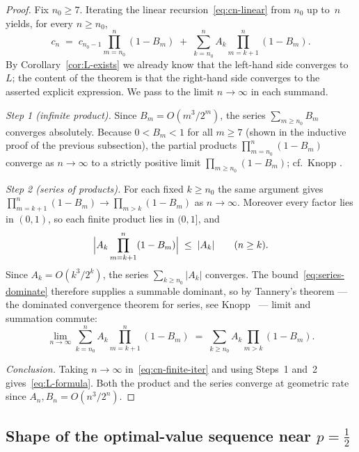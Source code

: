 \documentclass[12pt]{article}
\theoremstyle{definition}
\theoremstyle{remark}
\begin{document}
\begin{proof}
  Fix $n_0\ge 7$.  Iterating the linear
  recursion~\eqref{eq:cn-linear} from $n_0$ up to~$n$ yields, for
  every $n\ge n_0$,
  \begin{equation}\label{eq:cn-finite-iter}
    c_n \;=\; c_{n_0-1}\prod_{m=n_0}^n(1-B_m)
        \;+\; \sum_{k=n_0}^n A_k\prod_{m=k+1}^n(1-B_m).
  \end{equation}
  By Corollary~\ref{cor:L-exists} we already know that the
  left-hand side converges to~$L$; the content of the theorem is
  that the right-hand side converges to the asserted explicit
  expression.  We pass to the limit $n\to\infty$ in each summand.

  \emph{Step 1 (infinite product).}  Since $B_m=O(m^3/2^m)$, the
  series $\sum_{m\ge n_0}B_m$ converges absolutely.  Because
  $0<B_m<1$ for all $m\ge 7$ (shown in the inductive proof of
  the previous subsection), the partial products
  $\prod_{m=n_0}^n(1-B_m)$ converge as $n\to\infty$ to a strictly
  positive limit $\prod_{m\ge n_0}(1-B_m)$; cf.\ Knopp
  \cite[§29]{Knopp1990}.

  \emph{Step 2 (series of products).}  For each fixed $k\ge n_0$
  the same argument gives
  $\prod_{m=k+1}^n(1-B_m)\to\prod_{m>k}(1-B_m)$ as $n\to\infty$.
  Moreover every factor lies in $(0,1)$, so each finite product
  lies in $(0,1]$, and
  \begin{equation}\label{eq:series-dominate}
    \Bigl|A_k\prod_{m=k+1}^n(1-B_m)\Bigr|\;\le\;|A_k|
    \qquad(n\ge k).
  \end{equation}
  Since $A_k=O(k^3/2^k)$, the series $\sum_{k\ge n_0}|A_k|$
  converges.  The bound~\eqref{eq:series-dominate} therefore supplies
  a summable dominant, so by Tannery's theorem — the dominated
  convergence theorem for series, see Knopp~\cite[§41]{Knopp1990} —
  limit and summation commute:
  \[
    \lim_{n\to\infty}\sum_{k=n_0}^n A_k\prod_{m=k+1}^n(1-B_m)
    \;=\; \sum_{k\ge n_0}A_k\prod_{m>k}(1-B_m).
  \]

  \emph{Conclusion.}  Taking $n\to\infty$ in~\eqref{eq:cn-finite-iter}
  and using Steps~1 and~2 gives~\eqref{eq:L-formula}.  Both the
  product and the series converge at geometric rate
  since $A_n,B_n=O(n^3/2^n)$.
\end{proof}

\subsection{Shape of the optimal-value sequence near
  \texorpdfstring{$p=\tfrac12$}{p=1/2}}
\end{document}
